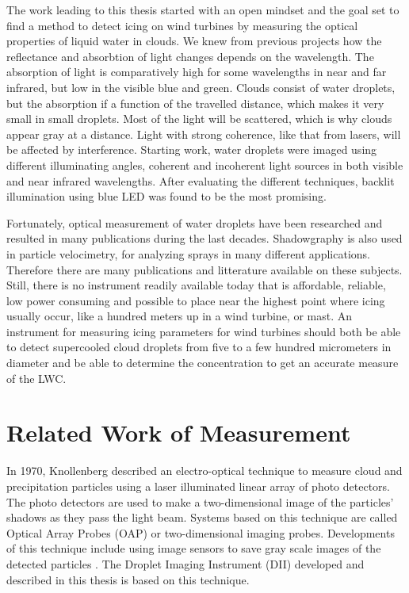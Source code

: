 The work leading to this thesis started with an open mindset and the goal set to find a method to detect icing on wind turbines by measuring the optical properties of liquid water in clouds. We knew from previous projects how the reflectance and absorbtion of light changes depends on the wavelength. The absorption of light is comparatively high for some wavelengths in near and far infrared, but low in the visible blue and green. Clouds consist of water droplets, but the absorption if a function of the travelled distance, which makes it very small in small droplets. Most of the light will be scattered, which is why clouds appear gray at a distance. Light with strong coherence, like that from lasers, will be affected by interference. Starting work, water droplets were imaged using different illuminating angles, coherent and incoherent light sources in both visible and near infrared wavelengths. After evaluating the different techniques, backlit illumination using blue LED was found to be the most promising.

Fortunately, optical measurement of water droplets have been researched and resulted in many publications during the last decades. Shadowgraphy is also used in particle velocimetry, for analyzing sprays in many different applications. Therefore there are many publications and litterature available on these subjects. Still, there is no instrument readily available today that is affordable, reliable, low power consuming and possible to place near the highest point where icing usually occur, like a hundred meters up in a wind turbine, or mast. An instrument for measuring icing parameters for wind turbines should both be able to detect supercooled cloud droplets from five to a few hundred micrometers in diameter and be able to determine the concentration to get an accurate measure of the LWC.

\section{Related Work of Measurement}
\label{sec:relwork}
In 1970, Knollenberg \cite{knoll1970} described an electro-optical technique to measure cloud and precipitation particles using a laser illuminated linear array of photo detectors. The photo detectors are used to make a two-dimensional image of the particles’ shadows as they pass the light beam. Systems based on this technique are called Optical Array Probes (OAP) or two-dimensional imaging probes. Developments of this technique include using image sensors to save gray scale images of the detected particles \cite{kulk2011,wend2013}. The Droplet Imaging Instrument (DII) developed and described in this thesis is based on this technique.

